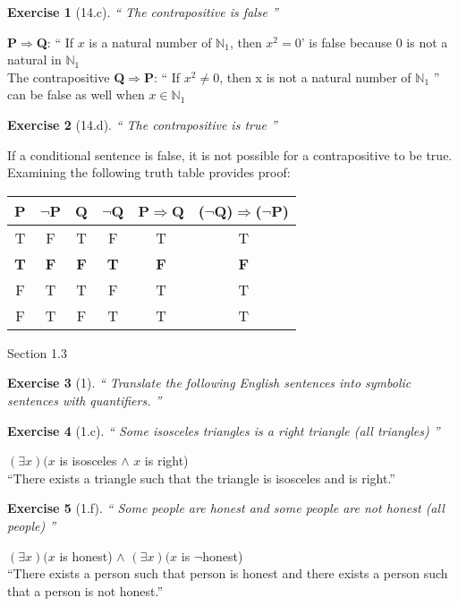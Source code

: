 \documentclass[11pt]{article}
\theoremstyle{quest}
\newtheorem*{exercise}{Exercise}
\begin{document}
\begin{exercise}[14.c]
  `` The contrapositive is false ''
\end{exercise}
\noindent \textbf{P$\Rightarrow$Q}: `` If $x$ is a natural number of $\mathbb{N}_1$, then $x^2=0$' is false because 0 is not a natural in $\mathbb{N}_1$ \\
\noindent The contrapositive \textbf{Q$\Rightarrow$P}: `` If $x^2$$\neq$$0$, then x is not a natural number of $\mathbb{N}_1$ '' can be false as well when $x$$\in$$\mathbb{N}_1$

\begin{exercise}[14.d]
  `` The contrapositive is true ''
\end{exercise}
\noindent If a conditional sentence is false, it is not possible for a contrapositive to be true. Examining the following truth table provides proof: \\ 
\begin{table}[ht] 
\centering %
\begin{tabular}{c c c c c c} %
\hline\hline %
P & $\neg$P & Q & $\neg$Q & P$\Rightarrow$Q & ($\neg$Q)$\Rightarrow$($\neg$P) \\ [0.5ex] %
\hline %
T & F & T & F & T & T \\ %
\textbf{T} & \textbf{F} & \textbf{F} & \textbf{T} & \textbf{F} & \textbf{F} \\
F & T & T & F & T & T \\
F & T & F & T & T & T \\ [1ex] %
\hline %
\end{tabular} 
\end{table}

\newpage

Section 1.3
\begin{exercise}[1]
  `` Translate the following English sentences into symbolic sentences with quantifiers.  ''
\end{exercise}
\begin{exercise}[1.c]
  `` Some isosceles triangles is a right triangle (all triangles) ''
\end{exercise}
$(\exists x)$$(x$ is isosceles $\wedge$ $x$ is right)\\
``There exists a triangle such that the triangle is isosceles and is right.''

\begin{exercise}[1.f]
  `` Some people are honest and some people are not honest (all people) ''
\end{exercise}
$(\exists x)$$(x$ is honest) $\wedge$ $(\exists x)$$(x$ is $\neg$honest) \\
``There exists a person such that person is honest and there exists a person such that a person is not honest.''
\end{document}

